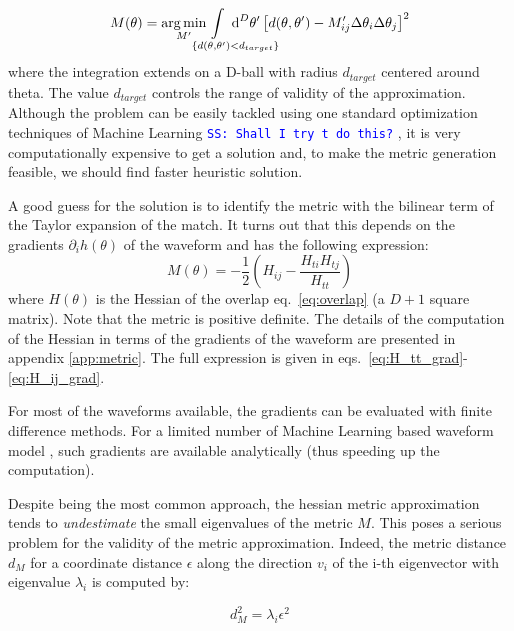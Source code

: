 \documentclass[twocolumn,showpacs,preprintnumbers,nofootinbib,prd,
superscriptaddress,10pt]{revtex4-1}
\renewcommand{\dvol}[2]{\ensuremath{\operatorname{d}^{#2}\!{#1}}}
\DeclareMathOperator*{\argmin}{arg\,min}
\newcommand{\stefano}[1]{{\textcolor{blue}{\texttt{SS: #1}} }}
\begin{document}
\begin{equation} \label{eq:metric_optmization}
	M(\theta) = \argmin_{M^\prime} \hspace{-4em} \int\limits_{\hspace{3em}\{d(\theta,\theta^\prime) < d_{target}\}} \hspace{-3.8em}
		\dvol{\theta^\prime}{D}  \left[ d(\theta,\theta^\prime) - M^\prime_{ij} \Delta\theta_i \Delta\theta_j
		\right]^2
\end{equation}
where the integration extends on a D-ball with radius $d_{target}$ centered around theta. The value $d_{target}$ controls the range of validity of the approximation.
Although the problem can be easily tackled using one standard optimization techniques of Machine Learning \stefano{Shall I try t do this?}, it is very computationally expensive to get a solution and, to make the metric generation feasible, we should find faster heuristic solution.

A good guess for the solution is to identify the metric with the bilinear term of the Taylor expansion of the match.
It turns out that this depends on the gradients $\partial_i h(\theta)$ of the waveform and has the following expression:
\begin{equation}\label{eq:metric_expression}
	M(\theta) = - \frac{1}{2} \left( H_{ij} - \frac{H_{ti}H_{tj}}{H_{tt}} \right)
\end{equation}
where $H(\theta)$ is the Hessian of the overlap eq.~\eqref{eq:overlap} (a $D+1$ square matrix). Note that the metric is positive definite.
The details of the computation of the Hessian in terms of the gradients of the waveform are presented in appendix \ref{app:metric}.
The full expression is given in eqs.~\eqref{eq:H_tt_grad}-\eqref{eq:H_ij_grad}.

For most of the waveforms available, the gradients can be evaluated with finite difference methods. For a limited number of Machine Learning based waveform model \cite{something}, such gradients are available analytically (thus speeding up the computation).

Despite being the most common approach, the hessian metric approximation tends to {\it undestimate} the small eigenvalues of the metric $M$. This poses a serious problem for the validity of the metric approximation.
Indeed, the metric distance $d_M$ for a coordinate distance $\epsilon$ along the direction $v_i$ of the i-th eigenvector with eigenvalue $\lambda_i$ is computed by:

\begin{equation}
	d^2_M =\lambda_i \epsilon^2
\end{equation}
\end{document}
